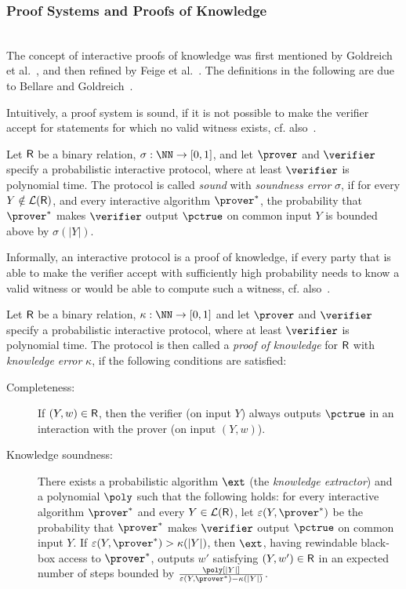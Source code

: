 \documentclass[runningheads]{llncs}
\begin{document}
\subsubsection{Proof Systems and Proofs of Knowledge}~\\

The concept of interactive proofs of knowledge was first mentioned by Goldreich et al.~\cite{STOC:GolMicRac85}, and then refined by Feige et al.~\cite{STOC:FeiFiaSha87}.
The definitions in the following are due to Bellare and Goldreich~\cite{C:BelGol92}.

Intuitively, a proof system is sound, if it is not possible to make the verifier accept for statements for which no valid witness exists, cf. also~\cite[1.6.2]{zkproof-reference}.
\begin{definition}\label{def:soundness}
  Let $\mathsf{R}$ be a binary relation, $\sigma:\NN\to[0,1]$, and let $\prover$ and $\verifier$ specify a probabilistic interactive protocol, where at least $\verifier$ is polynomial time.
  The protocol is called \emph{sound} with \emph{soundness error} $\sigma$, if for every $Y\notin\mathcal{L}(\mathsf{R})$,
  and every interactive algorithm $\prover^*$, the probability that $\prover^*$ makes $\verifier$ output $\accept$ on common input $Y$ is bounded above by $\sigma(|Y|)$.
\end{definition}

Informally, an interactive protocol is a proof of knowledge, if every party that is able to make the verifier accept with sufficiently high probability needs to know a valid witness or would be able to compute such a witness, cf. also~\cite[1.6.3]{zkproof-reference}.
\begin{definition}\label{def:pok}
  Let $\mathsf{R}$ be a binary relation, $\kappa:\NN\to[0,1]$ and let $\prover$ and $\verifier$ specify a probabilistic interactive protocol, where at least $\verifier$ is polynomial time.
  The protocol is then called a \emph{proof of knowledge} for $\mathsf{R}$ with \emph{knowledge error} $\kappa$, if the following conditions are satisfied:
  \begin{description}
    \item[Completeness:]
      If $(Y,w)\in\mathsf{R}$, then the verifier (on input $Y$) always outputs $\accept$ in an interaction with the prover (on input $(Y,w)$).
    \item[Knowledge soundness:]
      There exists a probabilistic algorithm $\ext$ (the \emph{knowledge extractor}) and a polynomial $\poly$ such that the following holds:
      for every interactive algorithm $\prover^*$ and every $Y\in\mathcal{L}(\mathsf{R})$, let $\varepsilon(Y,\prover^*)$ be the probability that $\prover^*$ makes $\verifier$ output $\accept$ on common input $Y$.
      If $\varepsilon(Y,\prover^*)>\kappa(|Y|)$, then $\ext$, having rewindable black-box access to $\prover^*$, outputs $w'$ satisfying $(Y,w')\in\mathsf{R}$ in an expected number of steps bounded by $\frac{\poly[|Y|]}{\varepsilon(Y,\prover^*)-\kappa(|Y|)}$.
  \end{description}
\end{definition}
\end{document}
